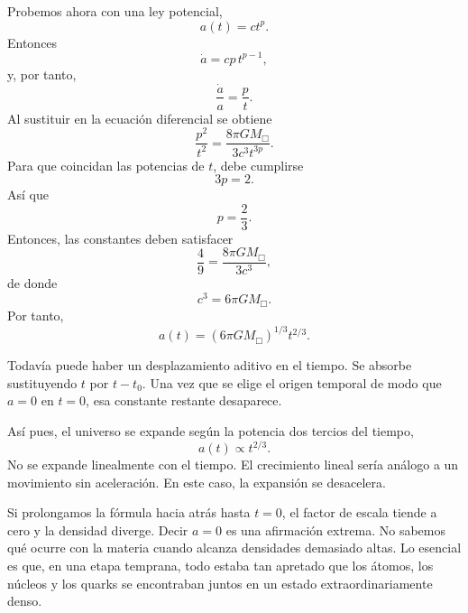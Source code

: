 Probemos ahora con una ley potencial,
\begin{equation}
a(t)=ct^p.
\end{equation}
Entonces
\begin{equation}
\dot a = cp\,t^{p-1},
\end{equation}
y, por tanto,
\begin{equation}
\frac{\dot a}{a}=\frac{p}{t}.
\end{equation}
Al sustituir en la ecuación diferencial se obtiene
\begin{equation}
\frac{p^2}{t^2}=\frac{8\pi G M_{\Box}}{3c^3t^{3p}}.
\end{equation}
Para que coincidan las potencias de \(t\), debe cumplirse
\begin{equation}
3p=2.
\end{equation}
Así que
\begin{equation}
p=\frac{2}{3}.
\end{equation}
Entonces, las constantes deben satisfacer
\begin{equation}
\frac{4}{9}=\frac{8\pi G M_{\Box}}{3c^3},
\end{equation}
de donde
\begin{equation}
c^3=6\pi G M_{\Box}.
\end{equation}
Por tanto,
\begin{equation}
a(t)=\left(6\pi G M_{\Box}\right)^{1/3}t^{2/3}.
\end{equation}

Todavía puede haber un desplazamiento aditivo en el tiempo. Se absorbe sustituyendo \(t\) por \(t-t_0\). Una vez que se elige el origen temporal de modo que \(a=0\) en \(t=0\), esa constante restante desaparece.

Así pues, el universo se expande según la potencia dos tercios del tiempo,
\begin{equation}
a(t)\propto t^{2/3}.
\end{equation}
No se expande linealmente con el tiempo. El crecimiento lineal sería análogo a un movimiento sin aceleración. En este caso, la expansión se desacelera.

Si prolongamos la fórmula hacia atrás hasta \(t=0\), el factor de escala tiende a cero y la densidad diverge. Decir \(a=0\) es una afirmación extrema. No sabemos qué ocurre con la materia cuando alcanza densidades demasiado altas. Lo esencial es que, en una etapa temprana, todo estaba tan apretado que los átomos, los núcleos y los quarks se encontraban juntos en un estado extraordinariamente denso.

